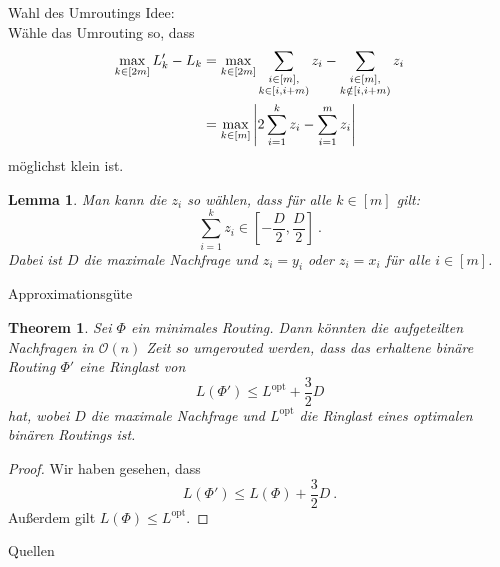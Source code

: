 \documentclass[8pt]{beamer}
\newcommand{\cO}{\mathcal{O}}
\newcommand{\Lopt}{L^{\mathrm{opt}}}
\theoremstyle{claim}
\newtheorem{mytheorem}[theorem]{Theorem}
\newtheorem{mylemma}[theorem]{Lemma}
\begin{document}
	\begin{frame}{Wahl des Umroutings}
		Idee:\\
		Wähle das Umrouting so, dass 
		\begin{align}
			\max_{k \in [2m]} L_k' - L_k &= \max_{k \in [2m]} \sum_{\substack{i \in [m],\\ k \in [i, i+m)}} z_i - \sum_{\substack{i \in [m],\\ k \notin[i, i+m)}} z_i\\
			&= \max_{k \in [m]} \abs{2\sum_{i = 1}^k z_i - \sum_{i = 1}^m z_i }
		\end{align}
		möglichst klein ist.\pause
		\begin{mylemma}
			Man kann die $z_i$ so wählen, dass für alle $k \in [m]$ gilt:
			\begin{equation}
				\sum_{i = 1}^k z_i \in [-\frac{D}{2}, \frac{D}{2}] \ .
			\end{equation}
			Dabei ist $D$ die maximale Nachfrage und $z_i = y_i$ oder $z_i = x_i$ für alle $i \in [m]$.
		\end{mylemma}
	\end{frame}
	
	\begin{frame}{Approximationsgüte}
		\begin{mytheorem}
			Sei $\Phi$ ein minimales Routing.
			Dann könnten die aufgeteilten Nachfragen in $\cO(n)$ Zeit so umgerouted werden, dass das erhaltene binäre Routing $\Phi'$ eine Ringlast von
			\begin{equation}
				L(\Phi') \leq \Lopt + \frac{3}{2} D
			\end{equation}
			hat, wobei $D$ die maximale Nachfrage und $\Lopt$ die Ringlast eines optimalen binären Routings ist.
		\end{mytheorem}
		\begin{proof}
			Wir haben gesehen, dass
			\begin{equation}
				L(\Phi') \leq L(\Phi) + \frac{3}{2} D \ .
			\end{equation}
			Außerdem gilt $L(\Phi) \leq \Lopt$.
		\end{proof}
	\end{frame}
	
	\begin{frame}{Quellen}
		\nocite{schrijver99, karp72}
		
	\end{frame}
\end{document}
